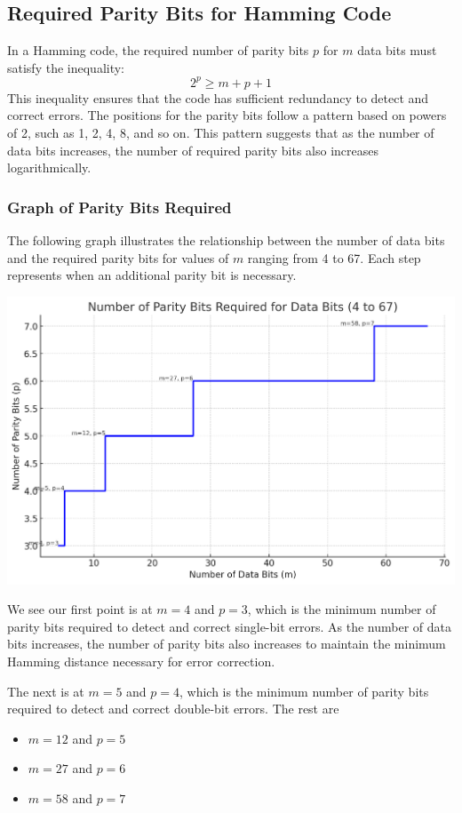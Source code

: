 \documentclass[12pt]{article}
\begin{document}
\subsection*{Required Parity Bits for Hamming Code}
In a Hamming code, the required number of parity bits \( p \) for \( m \) data bits must satisfy the inequality:
\[
	2^p \geq m + p + 1
\]
This inequality ensures that the code has sufficient redundancy to detect and correct errors. The positions for the parity bits follow a pattern based on powers of 2, such as 1, 2, 4, 8, and so on. This pattern suggests that as the number of data bits increases, the number of required parity bits also increases logarithmically.
\subsubsection*{Graph of Parity Bits Required}
The following graph illustrates the relationship between the number of data bits and the required parity bits for values of \( m \) ranging from 4 to 67. Each step represents when an additional parity bit is necessary.


\centerline{\includegraphics[scale=0.65]{examp071}}
We see our first point is at \(m = 4\) and \(p = 3\), which is the minimum number of parity bits required to detect and correct single-bit errors. As the number of data bits increases, the number of parity bits also increases to maintain the minimum Hamming distance necessary for error correction.

The next is at \(m = 5\) and \(p = 4\), which is the minimum number of parity bits required to detect and correct double-bit errors.
The rest are
\begin{itemize}
	\item \(m = 12\) and \(p = 5\)
	\item \(m = 27\) and \(p = 6\)
	\item \(m = 58\) and \(p = 7\)
\end{itemize}
\hline
\newpage
\end{document}
